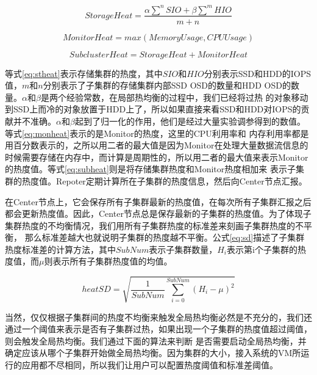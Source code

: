 \begin{equation}
    \label{eq:stheat}
    StorageHeat = \frac{\alpha \sum^n SIO + \beta \sum^m HIO}{m+n}
\end{equation}

\begin{equation}
    \label{eq:monheat}
    MonitorHeat = max(MemoryUsage, CPUUsage)
\end{equation}

\begin{equation}
    \label{eq:subheat}
    SubclusterHeat = StorageHeat + MonitorHeat
\end{equation}

等式\ref{eq:stheat}表示存储集群的热度，其中$SIO$和$HIO$分别表示SSD和HDD的IOPS值，$m$和$n$分别表示了子集群的存储集群内部SSD OSD的数量和HDD OSD的数量。$\alpha$和$\beta$是两个经验常数，在局部热均衡的过程中，我们已经将过热
的对象移动到SSD上而冷的对象放置于HDD上了，所以如果直接来看SSD和HDD对IOPS的贡献并不准确。$\alpha$和$\beta$起到了归一化的作用，他们是经过大量实验调参得到的数值。等式\ref{eq:monheat}表示的是Monitor的热度，这里的CPU利用率和
内存利用率都是用百分数表示的，之所以用二者的最大值是因为Monitor在处理大量数据流信息的时候需要存储在内存中，而计算是周期性的，所以用二者的最大值来表示Monitor的热度值。等式\ref{eq:subheat}则是将存储集群热度和Monitor热度相加来
表示子集群的热度值。Repoter定期计算所在子集群的热度信息，然后向Center节点汇报。

在Center节点上，它会保存所有子集群最新的热度值，在每次所有子集群汇报之后都会更新热度值。因此，Center节点总是保存最新的子集群的热度值。为了体现子集群热度的不均衡情况，我们用所有子集群热度的标准差来刻画子集群热度的不平衡，
那么标准差越大也就说明子集群的热度越不平衡。公式\ref{eq:sd}描述了子集群热度标准差的计算方法，其中$SubNum$表示子集群数量，$H_i$表示第i个子集群的热度值，而$\mu$则表示所有子集群热度值的均值。

\begin{equation}
    \label{eq:sd}
    heatSD = \sqrt{\frac{1}{SubNum} \sum_{i=0}^{SubNum} (H_i - \mu)^2}
\end{equation}

当然，仅仅根据子集群间的热度不均衡来触发全局热均衡必然是不充分的，我们还通过一个阈值来表示是否有子集群过热，如果出现一个子集群的热度值超过阈值，则会触发全局热均衡。我们通过下面的算法来判断
是否需要启动全局热均衡，并确定应该从哪个子集群开始做全局热均衡。因为集群的大小，接入系统的VM所运行的应用都不尽相同，所以我们让用户可以配置热度阈值和标准差阈值。

